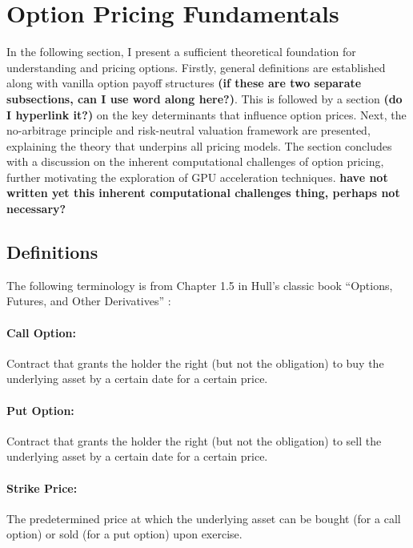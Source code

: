 \documentclass[english,12pt,a4paper,pdftex,sci,utf8]{aaltothesis}
\begin{document}
\clearpage

\section{Option Pricing Fundamentals} \label{sec:theory}

In the following section, I present a sufficient theoretical foundation for understanding and pricing options. Firstly, general definitions are established along with vanilla option payoff structures \textbf{(if these are two separate subsections, can I use word along here?)}. This is followed by a section \textbf{(do I hyperlink it?)} on the key determinants that influence option prices. Next, the no-arbitrage principle and risk-neutral valuation framework are presented, explaining the theory that underpins all pricing models. The section concludes with a discussion on the inherent computational challenges of option pricing, further motivating the exploration of GPU acceleration techniques. \textbf{have not written yet this inherent computational challenges thing, perhaps not necessary?} \


\subsection{Definitions}\label{subsec:definitions}
The following terminology is from Chapter 1.5 in Hull's classic book ``Options, Futures, and Other Derivatives'' \cite{hull2016options}:

\paragraph{Call Option:}Contract that grants the holder the right (but not the obligation) to buy the underlying asset by a certain date for a certain price.

\paragraph{Put Option:}Contract that grants the holder the right (but not the obligation) to sell the underlying asset by a certain date for a certain price.

\paragraph{Strike Price:}The predetermined price at which the underlying asset can be bought (for a call option) or sold (for a put option) upon exercise.
\end{document}
